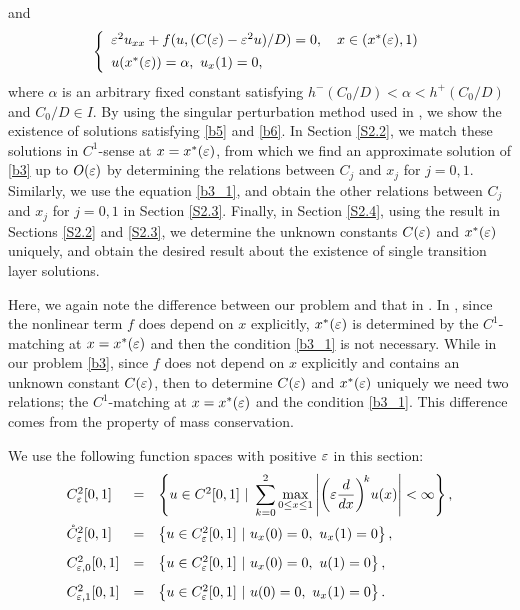 \documentclass[a4,10pt]{article}
\begin{document}
%
and
%
\begin{equation}\label{b6}
\left \{
\begin{array}{l}
\varepsilon^2 u_{xx} + f( u,  (C(\varepsilon) - \varepsilon^2 u )/D ) = 0, \ \ \ x \in  (x^*(\varepsilon), 1) \\[1ex]
u(x^*(\varepsilon)) = \alpha, \ u_x(1) = 0, 
\end{array} 
\right.
\end{equation}
where $\alpha$ is an arbitrary fixed constant satisfying $h^-(C_0/D) < \alpha < h^+(C_0/D)$ and $C_0/D \in I$.
By using the singular perturbation method used in \cite{I}, we show the existence of solutions satisfying \eqref{b5} and \eqref{b6}. In Section \ref{S2.2}, we match these solutions in $C^1$-sense at $x = x^*(\varepsilon)$, from which we find an approximate solution of \eqref{b3} up to $O(\varepsilon)$ by determining the relations between $C_j$ and $x_j$ for $j=0,1$. Similarly, we use the equation \eqref{b3_1}, and obtain the other relations  between $C_j$ and $x_j$ for $j=0,1$ in Section \ref{S2.3}. 
Finally, in Section \ref{S2.4}, using the result in Sections \ref{S2.2} and \ref{S2.3}, we determine the unknown constants $C(\varepsilon)$ and 
$x^*(\varepsilon)$ uniquely, and obtain the desired result about the existence of single transition layer solutions. 

Here, we again note the difference between our problem and that in \cite{I}. In \cite{I}, since the nonlinear term $f$ does depend on $x$ explicitly, $x^*(\varepsilon)$ is determined by the $C^1$-matching at $x = x^*(\varepsilon)$ and then the condition \eqref{b3_1} is not necessary. While in our problem \eqref{b3}, since $f$ does not depend on $x$ explicitly and contains an unknown constant $C(\varepsilon)$, then to determine $C(\varepsilon)$ and $x^*(\varepsilon)$ uniquely we need two relations;  the $C^1$-matching at $x = x^*(\varepsilon)$ and the condition \eqref{b3_1}. This difference comes from the property of mass conservation. 

We use the following function spaces with positive $\varepsilon$ in this section: 
\begin{equation*}
\begin{array}{lcl}
C^2_\ep[0,1] & = & \left\{ u \in C^2[0,1] \ | \ \dis \sum_{k=0}^2 \max_{0 \leq x \leq 1} \left| \left( \ep \frac {d}{dx}\right)^{\! k} \! u(x) \right| < \infty \right\}, \\[3.5ex]
\pot{C}^2_\ep[0,1] & = & \left\{ u \in C^2_\ep[0,1] \ | \ u_x(0) = 0, \ u_x(1) = 0 \right\},  \\[2ex]
C^2_{\ep,0}[0,1] & = & \left\{ u \in C^2_\ep[0,1] \ | \ u_x(0) = 0, \ u(1) = 0 \right\},  \\[2ex]
C^2_{\ep,1}[0,1] & = & \left\{ u \in C^2_\ep[0,1] \ | \ u(0) = 0, \ u_x(1) = 0 \right\}.
\end{array} 
\end{equation*}
\end{document}
